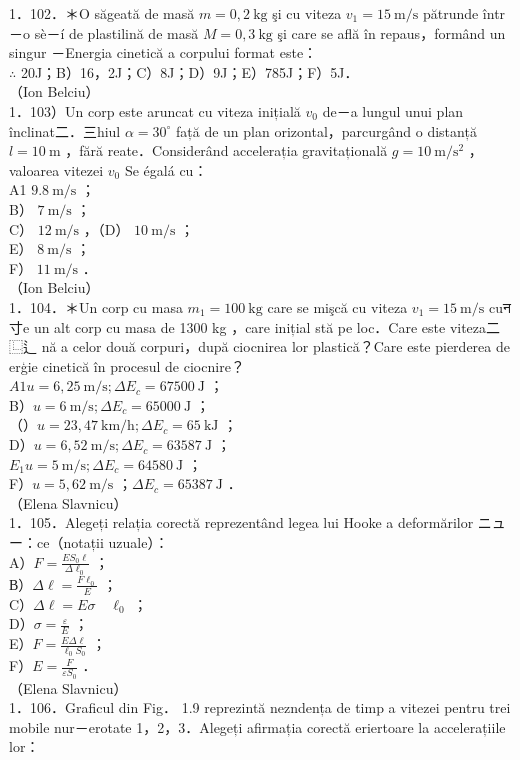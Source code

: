 \documentclass[10pt]{article}
\begin{document}
1．102．＊O săgeată de masă $m=0,2 \mathrm{~kg}$ şi cu viteza $v_{1}=15 \mathrm{~m} / \mathrm{s}$ pătrunde într－o sè－í de plastilină de masă $M=0,3 \mathrm{~kg}$ şi care se află în repaus，formând un singur －Energia cinetică a corpului format este：\\
$\therefore$ 20J；B）16，2J；C）8J；D）9J；E）785J；F）5J．\\
（Ion Belciu）\\
1．103）Un corp este aruncat cu viteza inițială $v_{0}$ de－a lungul unui plan înclinat二．三hiul $\alpha=30^{\circ}$ față de un plan orizontal，parcurgând o distanță $l=10 \mathrm{~m}$ ，fără reate．Considerând accelerația gravitațională $g=10 \mathrm{~m} / \mathrm{s}^{2}$ ，valoarea vitezei $v_{0}$ Se égalá cu：\\
A1 $9.8 \mathrm{~m} / \mathrm{s}$ ；\\
B） $7 \mathrm{~m} / \mathrm{s}$ ；\\
C） $12 \mathrm{~m} / \mathrm{s}$ ，（D） $10 \mathrm{~m} / \mathrm{s}$ ；\\
E） $8 \mathrm{~m} / \mathrm{s}$ ；\\
F） $11 \mathrm{~m} / \mathrm{s}$ ．\\
（Ion Belciu）\\
1．104．＊Un corp cu masa $m_{1}=100 \mathrm{~kg}$ care se mişcă cu viteza $v_{1}=15 \mathrm{~m} / \mathrm{s}$ cuन寸e un alt corp cu masa de 1300 kg ，care inițial stă pe loc．Care este viteza二⿺辶 nă a celor două corpuri，după ciocnirea lor plastică？Care este pierderea de erģie cinetică în procesul de ciocnire？\\
$A 1 u=6,25 \mathrm{~m} / \mathrm{s} ; \Delta E_{c}=67500 \mathrm{~J}$ ；\\
B）$u=6 \mathrm{~m} / \mathrm{s} ; \Delta E_{c}=65000 \mathrm{~J}$ ；\\
（）$u=23,47 \mathrm{~km} / \mathrm{h} ; \Delta E_{c}=65 \mathrm{~kJ}$ ；\\
D）$u=6,52 \mathrm{~m} / \mathrm{s} ; \Delta E_{c}=63587 \mathrm{~J}$ ；\\
$E_{1} u=5 \mathrm{~m} / \mathrm{s} ; \Delta E_{c}=64580 \mathrm{~J}$ ；\\
F）$u=5,62 \mathrm{~m} / \mathrm{s}$ ；$\Delta E_{c}=65387 \mathrm{~J}$ ．\\
（Elena Slavnicu）\\
1．105．Alegeți relația corectă reprezentând legea lui Hooke a deformărilor ニュー：ce（notații uzuale）：\\
A）$F=\frac{E S_{0} \ell}{\Delta \ell_{0}}$ ；\\
В）$\Delta \ell=\frac{F \ell_{0}}{E}$ ；\\
C）$\Delta \ell=E \sigma \quad \ell_{0}$ ；\\
D）$\sigma=\frac{\varepsilon}{E}$ ；\\
E）$F=\frac{E \Delta \ell}{\ell_{0} S_{0}}$ ；\\
F）$E=\frac{F}{\varepsilon S_{0}}$ ．\\
（Elena Slavnicu）\\
1．106．Graficul din Fig． 1.9 reprezintă nezndența de timp a vitezei pentru trei mobile nur－erotate 1，2，3．Alegeți afirmația corectă eriertoare la accelerațiile lor：
\end{document}
